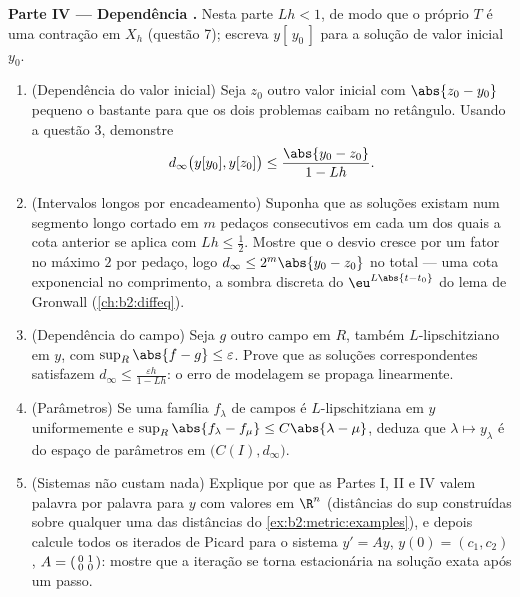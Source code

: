 \begin{problem}
\medskip
\noindent\textbf{Parte IV --- Dependência .} Nesta
parte $Lh < 1$, de modo que o próprio $T$ é uma contração em $X_h$ (questão
7); escreva $y[\,y_0\,]$ para a solução de valor inicial
$y_0$.
\begin{enumerate}[resume]
  \item (Dependência do valor inicial) Seja $z_0$ outro
        valor inicial com $\abs{z_0 - y_0}$ pequeno o bastante para que
        os dois problemas caibam no retângulo. Usando a questão 3,
        demonstre
        \[
        d_\infty\bigl(y[y_0], y[z_0]\bigr) \leq
        \frac{\abs{y_0 - z_0}}{1 - Lh}.
        \]
  \item (Intervalos longos por encadeamento) Suponha que as soluções existam
        num segmento longo cortado em $m$ pedaços consecutivos em
        cada um dos quais a cota anterior se aplica com $Lh \leq
        \frac12$. Mostre que o desvio cresce por um fator no máximo
        $2$ por pedaço, logo $d_\infty \leq 2^m\abs{y_0 - z_0}$
        no total --- uma cota exponencial no comprimento, a sombra
        discreta do $\eu^{L\abs{t - t_0}}$ do lema de Gronwall
        (\cref{ch:b2:diffeq}).
  \item (Dependência do campo) Seja $g$ outro campo em
        $R$, também $L$-lipschitziano em $y$, com $\sup_R \abs{f - g}
        \leq \varepsilon$. Prove que as soluções
        correspondentes satisfazem $d_\infty \leq
        \frac{\varepsilon h}{1 - Lh}$: o erro de
        modelagem se propaga linearmente.
  \item (Parâmetros) Se uma família $f_\lambda$ de campos é
        $L$-lipschitziana em $y$ uniformemente e $\sup_R\abs{f_\lambda
        - f_\mu} \leq C\abs{\lambda - \mu}$, deduza que
        $\lambda \mapsto y_\lambda$ é  do
        espaço de parâmetros em $\bigl(C(I), d_\infty\bigr)$.
  \item (Sistemas não custam nada) Explique por que as Partes I, II e IV
        valem palavra por palavra para $y$ com valores em $\R^n$ (distâncias
        do sup construídas sobre qualquer uma das distâncias do
        \cref{ex:b2:metric:examples}), e depois calcule todos os iterados
        de Picard para o sistema $y' = Ay$, $y(0) = (c_1,
        c_2)$, $A = \begin{psmallmatrix} 0 & 1\\ 0 &
        0\end{psmallmatrix}$: mostre que a iteração se torna
        estacionária na solução exata após um passo.
\end{enumerate}


\end{problem}
